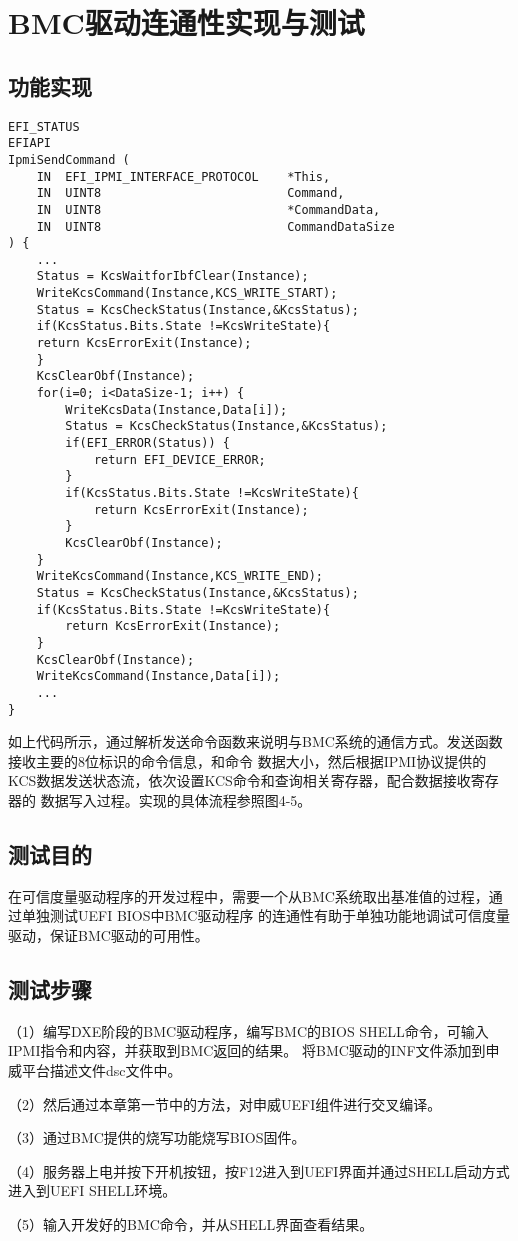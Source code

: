 %
%
\section{BMC驱动连通性实现与测试}
\subsection{功能实现}
\begin{lstlisting}
EFI_STATUS
EFIAPI
IpmiSendCommand (
    IN  EFI_IPMI_INTERFACE_PROTOCOL    *This,
    IN  UINT8                          Command,
    IN  UINT8                          *CommandData,
    IN  UINT8                          CommandDataSize
) {
    ...
    Status = KcsWaitforIbfClear(Instance);
    WriteKcsCommand(Instance,KCS_WRITE_START);
    Status = KcsCheckStatus(Instance,&KcsStatus);
    if(KcsStatus.Bits.State !=KcsWriteState){
    return KcsErrorExit(Instance);
    }
    KcsClearObf(Instance);
    for(i=0; i<DataSize-1; i++) {
        WriteKcsData(Instance,Data[i]);
        Status = KcsCheckStatus(Instance,&KcsStatus);
        if(EFI_ERROR(Status)) {
            return EFI_DEVICE_ERROR;
        }
        if(KcsStatus.Bits.State !=KcsWriteState){
            return KcsErrorExit(Instance);
        }
        KcsClearObf(Instance);
    }
    WriteKcsCommand(Instance,KCS_WRITE_END);
    Status = KcsCheckStatus(Instance,&KcsStatus);
    if(KcsStatus.Bits.State !=KcsWriteState){
        return KcsErrorExit(Instance);
    }
    KcsClearObf(Instance);
    WriteKcsCommand(Instance,Data[i]);
    ...
}
\end{lstlisting}
如上代码所示，通过解析发送命令函数来说明与BMC系统的通信方式。发送函数接收主要的8位标识的命令信息，和命令
数据大小，然后根据IPMI协议提供的KCS数据发送状态流，依次设置KCS命令和查询相关寄存器，配合数据接收寄存器的
数据写入过程\cite{english22}。实现的具体流程参照图4-5。

\subsection{测试目的}
在可信度量驱动程序的开发过程中，需要一个从BMC系统取出基准值的过程，通过单独测试UEFI BIOS中BMC驱动程序
的连通性有助于单独功能地调试可信度量驱动，保证BMC驱动的可用性。

\subsection{测试步骤}
（1）编写DXE阶段的BMC驱动程序，编写BMC的BIOS SHELL命令，可输入IPMI指令和内容，并获取到BMC返回的结果。
将BMC驱动的INF文件添加到申威平台描述文件dsc文件中。
\par （2）然后通过本章第一节中的方法，对申威UEFI组件进行交叉编译。
\par （3）通过BMC提供的烧写功能烧写BIOS固件。
\par （4）服务器上电并按下开机按钮，按F12进入到UEFI界面并通过SHELL启动方式进入到UEFI SHELL环境。
\par （5）输入开发好的BMC命令，并从SHELL界面查看结果。

